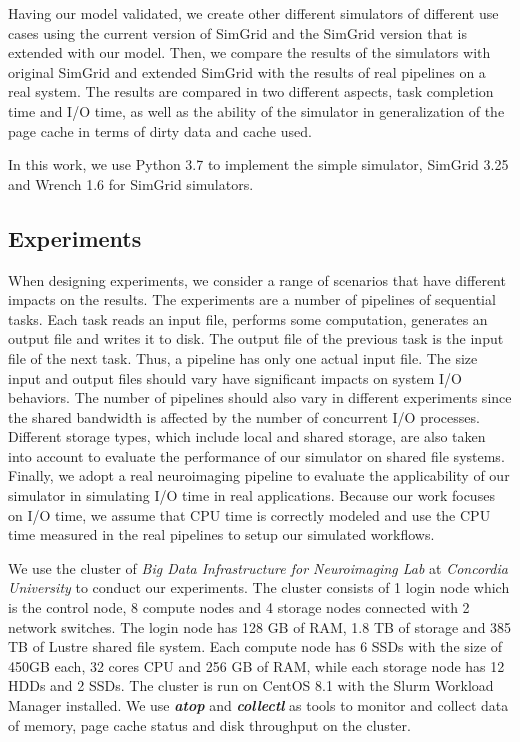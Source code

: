 \documentclass[conference]{IEEEtran}
\begin{document}
			Having our model validated, we create other different simulators of different use cases using the current version of SimGrid and the SimGrid version that is extended with our model. Then, we compare the results of the simulators with original SimGrid and extended SimGrid with the results of real pipelines on a real system. The results are compared in two different aspects, task completion time and I/O time, as well as the ability of the simulator in generalization of the page cache in terms of dirty data and cache used.
		
			In this work, we use Python 3.7 to implement the simple simulator, SimGrid 3.25 and Wrench 1.6 for SimGrid simulators.
			
		\subsection{Experiments}
		
			When designing experiments, we consider a range of scenarios that have different impacts on the results. The experiments are a number of pipelines of sequential tasks. Each task reads an input file, performs some computation, generates an output file and writes it to disk. The output file of the previous task is the input file of the next task. Thus, a pipeline has only one actual input file. The size input and output files should vary have significant impacts on system I/O behaviors. The number of pipelines should also vary in different experiments since the shared bandwidth is affected by the number of concurrent I/O processes. Different storage types, which include local and shared storage, are also taken into account to evaluate the performance of our simulator on shared file systems. Finally, we adopt a real neuroimaging pipeline to evaluate the applicability of our simulator in simulating I/O time in real applications. Because our work focuses on I/O time, we assume that CPU time is correctly modeled and use the CPU time measured in the real pipelines to setup our simulated workflows. 
			
			We use the cluster of \textit{Big Data Infrastructure for Neuroimaging Lab} at \textit{Concordia University} to conduct our experiments. The cluster consists of 1 login node which is the control node, 8 compute nodes and 4 storage nodes connected with 2 network switches. The login node has 128 GB of RAM, 1.8 TB of storage and 385 TB of Lustre shared file system. Each compute node has 6 SSDs with the size of 450GB each, 32 cores CPU and 256 GB of RAM, while each storage node has 12 HDDs and 2 SSDs. The cluster is run on CentOS 8.1 with the Slurm Workload Manager installed. We use \textbf{\textit{atop}} and \textbf{\textit{collectl}} as tools to monitor and collect data of memory, page cache status and disk throughput on the cluster.
	
\end{document}
